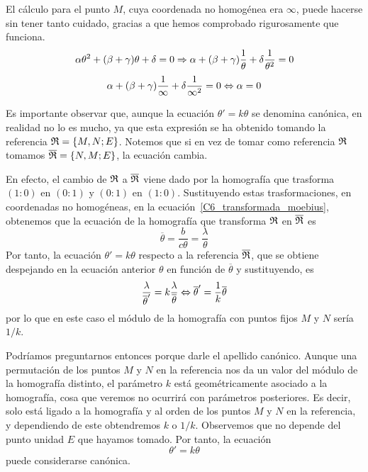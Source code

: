 \begin{obs}
	El cálculo para el punto $M$, cuya coordenada no homogénea era $\infty$, puede hacerse sin tener tanto cuidado, gracias a que hemos comprobado rigurosamente que funciona.
	\begin{equation*}
		\alpha\theta^2+(\beta+\gamma)\theta+\delta=0\Rightarrow\alpha+(\beta+\gamma)\frac{1}{\theta}+\delta\frac{1}{\theta^2}=0
	\end{equation*}
	\begin{equation*}
		\alpha+(\beta+\gamma)\frac{1}{\infty}+\delta\frac{1}{\infty^2}=0\Leftrightarrow \alpha=0
	\end{equation*}
\end{obs}
Es importante observar que, aunque la ecuación $\theta'=k\theta$ se denomina canónica, en realidad no lo es mucho, ya que esta expresión se ha obtenido tomando la referencia $\mathfrak{R}=\{M,N;E\}$. Notemos que si en vez de tomar como referencia $\mathfrak{R}$ tomamos $\overline{\mathfrak{R}}=\{N,M;E\}$, la ecuación cambia.

En efecto, el cambio de $\mathfrak{R}$ a $\overline{\mathfrak{R}}$ viene dado por la homografía que trasforma $(1:0)$ en $(0:1)$ y $(0:1)$ en $(1:0)$. Sustituyendo estas trasformaciones, en coordenadas no homogéneas, en la ecuación~\eqref{C6_transformada_moebius}, obtenemos que la ecuación de la homografía que transforma $\mathfrak{R}$ en $\overline{\mathfrak{R}}$ es
\begin{equation*}
	\overline{\theta}=\frac{b}{c\theta}=\frac{\lambda}{\theta}
\end{equation*}
Por tanto, la ecuación $\theta'=k\theta$ respecto a la referencia $\overline{\mathfrak{R}}$, que se obtiene despejando en la ecuación anterior $\theta$ en función de $\overline{\theta}$ y sustituyendo, es
\begin{equation*}
	\frac{\lambda}{\overline{\theta}'}=k\frac{\lambda}{\overline{\theta}}\Leftrightarrow \overline{\theta}'=\frac{1}{k}\overline{\theta}
\end{equation*}
por lo que en este caso el módulo de la homografía con puntos fijos $M$ y $N$ sería $1/k$. 

Podríamos preguntarnos entonces porque darle el apellido canónico. Aunque una permutación de los puntos $M$ y $N$ en la referencia nos da un valor del módulo de la homografía distinto, el parámetro $k$ está geométricamente asociado a la homografía, cosa que veremos no ocurrirá con parámetros posteriores. Es decir, solo está ligado a la homografía y al orden de los puntos $M$ y $N$ en la referencia, y dependiendo de este obtendremos $k$ o $1/k$. Observemos que no depende del punto unidad $E$ que hayamos tomado. Por tanto, la ecuación
\begin{equation}
	\label{C6_theta_ktheta}
	\theta'=k\theta
\end{equation}
puede considerarse canónica.

